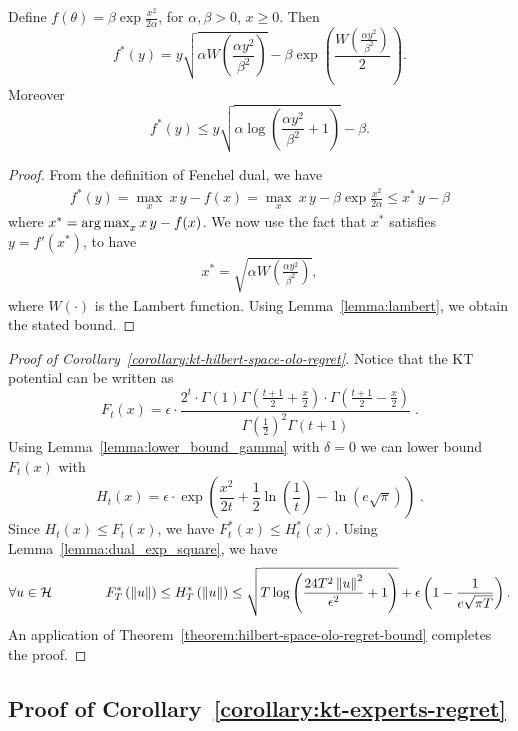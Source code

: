 \begin{lemma}
\label{lemma:dual_exp_square}
Define $f(\theta)= \beta \exp\frac{x^2}{2 \alpha}$, for $\alpha,\beta>0$, $x\geq0$. Then
\[
f^*(y)=y \sqrt{\alpha W\left(\frac{\alpha y^2}{\beta^2}\right)} - \beta \exp\left(\frac{W\left(\frac{\alpha y^2}{\beta^2}\right)}{2}\right).
\]
Moreover
\[
f^*(y) \leq y \sqrt{\alpha \log \left(\frac{\alpha y^2}{\beta^2} +1 \right)} - \beta.
\]
\end{lemma}
%
\begin{proof}
From the definition of Fenchel dual, we have
\begin{align*}
f^*(y)= \max_{x} \  x\, y - f(x) = \max_{x} \  x\, y - \beta \exp\frac{x^2}{2 \alpha} \leq x^*\,y -\beta
\end{align*}
where $x^*= \operatorname*{arg\,max}_{x} x\, y - f(x)$. We now use the fact that $x^*$ satisfies $y = f'(x^*)$, to have
\begin{align*}
x^*=\sqrt{\alpha W\left(\frac{\alpha y^2}{\beta^2}\right)},
\end{align*}
where $W(\cdot)$ is the Lambert function.
Using Lemma~\ref{lemma:lambert}, we obtain the stated bound.
\end{proof}


\begin{proof}[Proof of Corollary~\ref{corollary:kt-hilbert-space-olo-regret}]
Notice that the KT potential can be written as
\[
F_t(x) = \epsilon \cdot \frac{2^t \cdot \Gamma(1) \Gamma \left(\frac{t+1}{2} + \frac{x}{2} \right) \cdot \Gamma \left(\frac{t+1}{2} - \frac{x}{2} \right)}{ \Gamma(\frac{1}{2})^2 \Gamma(t+1)} \; .
\]
Using Lemma~\ref{lemma:lower_bound_gamma} with $\delta = 0$ we can lower bound $F_t(x)$ with
\[
H_t(x) = \epsilon \cdot \exp\left(\frac{x^2}{2t} + \frac{1}{2} \ln \left(\frac{1}{t} \right) - \ln (e \sqrt{\pi}) \right) \; .
\]
Since $H_t(x) \le F_t(x)$, we have $F^*_t(x) \le H_t^*(x)$. Using Lemma~\ref{lemma:dual_exp_square}, we have
\[
\forall u \in \mathcal{H} \qquad \qquad
F^*_T\left(\left\|{u}\right\|\right)
\le H^*_T\left(\left\|{u}\right\|\right)
\le \sqrt{T \log \left(\frac{24 T^2 \left\|{u}\right\|^2}{\epsilon^2} +1 \right)}+\epsilon\left(1-\frac{1}{e \sqrt{ \pi T}}\right).
\]
An application of Theorem~\ref{theorem:hilbert-space-olo-regret-bound} completes the proof.
\end{proof}

\subsection{Proof of Corollary~\ref{corollary:kt-experts-regret}}

